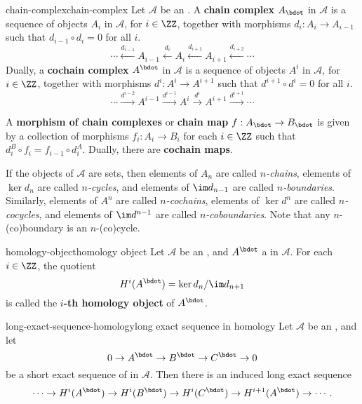 \begin{topic}{chain-complex}{chain-complex}
    Let $\mathcal{A}$ be an . A \textbf{chain complex} $A_\bdot$ in $\mathcal{A}$ is a sequence of objects $A_i$ in $\mathcal{A}$, for $i \in \ZZ$, together with morphisms $d_i : A_i \to A_{i - 1}$ such that $d_{i - 1} \circ d_i = 0$ for all $i$.
    \[ \cdots \xleftarrow{d_{i - 1}} A_{i - 1} \xleftarrow{d_i} A_i \xleftarrow{d_{i + 1}} A_{i + 1} \xleftarrow{d_{i + 2}} \cdots \]
    Dually, a \textbf{cochain complex} $A^\bdot$ in $\mathcal{A}$ is a sequence of objects $A^i$ in $\mathcal{A}$, for $i \in \ZZ$, together with morphisms $d^i : A^i \to A^{i + 1}$ such that $d^{i + 1} \circ d^i = 0$ for all $i$.
    \[ \cdots \xrightarrow{d^{i - 2}} A^{i - 1} \xrightarrow{d^{i - 1}} A^i \xrightarrow{d^i} A^{i + 1} \xrightarrow{d^{i + 1}} \cdots \]
    
    A \textbf{morphism of chain complexes} or \textbf{chain map} $f : A_\bdot \to B_\bdot$ is given by a collection of morphisms $f_i : A_i \to B_i$ for each $i \in \ZZ$ such that $d^B_i \circ f_i = f_{i - 1} \circ d^A_i$. Dually, there are \textbf{cochain maps}.
    
    If the objects of $\mathcal{A}$ are sets, then elements of $A_n$ are called \textit{$n$-chains}, elements of $\ker d_n$ are called \textit{$n$-cycles}, and elements of $\im d_{n - 1}$ are called \textit{$n$-boundaries}. Similarly, elements of $A^n$ are called \textit{$n$-cochains}, elements of $\ker d^n$ are called \textit{$n$-cocycles}, and elements of $\im d^{n - 1}$ are called \textit{$n$-coboundaries}. Note that any $n$-(co)boundary is an $n$-(co)cycle.
\end{topic}

\begin{topic}{homology-object}{homology object}
    Let $\mathcal{A}$ be an , and $A^\bdot$ a  in $\mathcal{A}$. For each $i \in \ZZ$, the quotient
    \[ H^i(A^\bdot) = \ker d_n / \im d_{n + 1} \]
    is called the \textbf{$i$-th homology object} of $A^\bdot$.
\end{topic}

\begin{topic}{long-exact-sequence-homology}{long exact sequence in homology}
    Let $\mathcal{A}$ be an , and let
    \[ 0 \rightarrow A^\bdot \rightarrow B^\bdot \rightarrow C^\bdot \rightarrow 0 \]
    be a short exact sequence of  in $\mathcal{A}$. Then there is an induced long exact sequence
    \[ \cdots \rightarrow H^i(A^\bdot) \rightarrow H^i(B^\bdot) \rightarrow H^i(C^\bdot) \rightarrow H^{i + 1}(A^\bdot) \rightarrow \cdots . \]
\end{topic}

